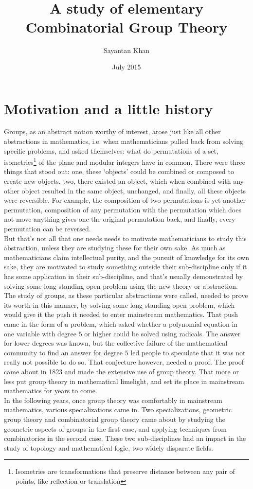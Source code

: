 \documentclass[12pt]{article}
\title{A study of elementary Combinatorial Group Theory}
\author{Sayantan Khan}
\date{July 2015}
\theoremstyle{definition}
\begin{document}
\maketitle

\tableofcontents

\section{Motivation and a little history}

Groups, as an abstract notion worthy of interest, arose just like all other abstractions in mathematics, i.e. when mathematicians pulled back from solving specific problems, and asked themselves: what do permutations of a set, isometries\footnote{Isometries are transformations that preserve distance between any pair of points, like reflection or translation} of the plane and modular integers have in common. There were three things that stood out: one, these `objects' could be combined or composed to create new objects, two, there existed an object, which when combined with any other object resulted in the same object, unchanged, and finally, all these objects were reversible. For example, the composition of two permutations is yet another permutation, composition of any permutation with the permutation which does not move anything gives one the original permutation back, and finally, every permutation can be reversed.\\
But that's not all that one needs needs to motivate mathematicians to study this abstraction, unless they are studying these for their own sake. As much as mathematicians claim intellectual purity, and the pursuit of knowledge for its own sake, they are motivated to study something outside their sub-discipline only if it has some application in their sub-discipline, and that's usually demonstrated by solving some long standing open problem using the new theory or abstraction.\\
The study of groups, as these particular abstractions were called, needed to prove its worth in this manner, by solving some long standing open problem, which would give it the push it needed to enter mainstream mathematics. That push came in the form of a problem, which asked whether a polynomial equation in one variable with degree $5$ or higher could be solved using radicals. The answer for lower degrees was known, but the collective failure of the mathematical community to find an answer for degree $5$ led people to speculate that it was not really not possible to do so. That conjecture however, needed a proof. The proof came about in 1823 and made the extensive use of group theory. That more or less put group theory in mathematical limelight, and set its place in mainstream mathematics for years to come.\\
In the following years, once group theory was comfortably in mainstream mathematics, various specializations came in. Two specializations, geometric group theory and combinatorial group theory came about by studying the geometric aspects of groups in the first case, and applying techniques from combinatorics in the second case. These two sub-disciplines had an impact in the study of topology and mathematical logic, two widely disparate fields.
\end{document}
